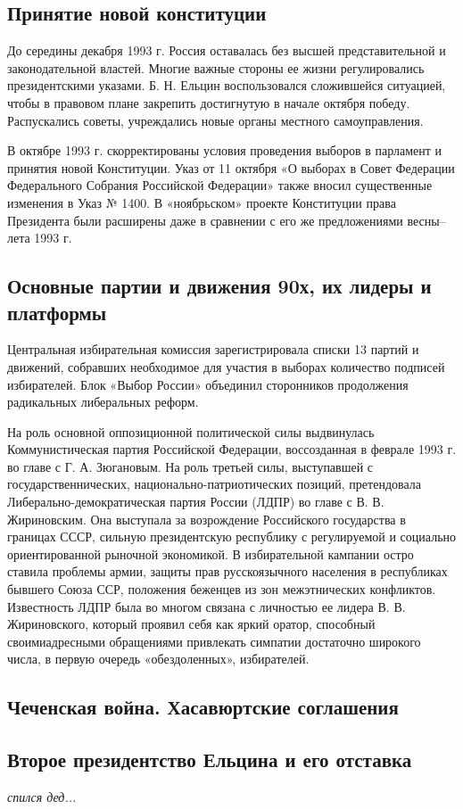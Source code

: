 \subsection{Принятие новой конституции}

До середины декабря 1993 г. Россия оставалась без высшей представительной и законодательной властей. Многие важные стороны ее жизни регулировались президентскими указами. Б. Н. Ельцин воспользовался сложившейся ситуацией, чтобы в правовом плане закрепить достигнутую в начале октября победу. Распускались советы, учреждались новые органы местного самоуправления.

В октябре 1993 г. скорректированы условия проведения выборов в парламент и принятия новой Конституции. Указ от 11 октября «О выборах в Совет Федерации Федерального Собрания Российской Федерации» также вносил существенные изменения в Указ № 1400. В «ноябрьском» проекте Конституции права Президента были расширены даже в сравнении с его же предложениями весны–лета 1993 г.

\subsection{Основные партии и движения 90х, их лидеры и платформы}
Центральная избирательная комиссия зарегистрировала списки 13 партий и движений, собравших необходимое для участия в выборах количество подписей избирателей. Блок «Выбор России» объединил сторонников продолжения радикальных либеральных реформ.

На роль основной оппозиционной политической силы выдвинулась Коммунистическая партия Российской Федерации, воссозданная в феврале 1993 г. во главе с Г. А. Зюгановым. На роль третьей силы, выступавшей с государственнических, национально-патриотических позиций, претендовала Либерально-демократическая партия России (ЛДПР) во главе с В. В. Жириновским. Она выступала за возрождение Российского государства в границах СССР, сильную президентскую республику с регулируемой и социально ориентированной рыночной экономикой. В избирательной кампании остро ставила проблемы армии, защиты прав русскоязычного населения в республиках бывшего Союза ССР, положения беженцев из зон межэтнических конфликтов. Известность ЛДПР была во многом связана с личностью ее лидера В. В. Жириновского, который проявил себя как яркий оратор, способный своимиадресными обращениями привлекать симпатии достаточно широкого числа, в первую очередь «обездоленных», избирателей.
\subsection{Чеченская война. Хасавюртские соглашения}
\subsection{Второе президентство Ельцина и его отставка}
{\it спился дед...}
